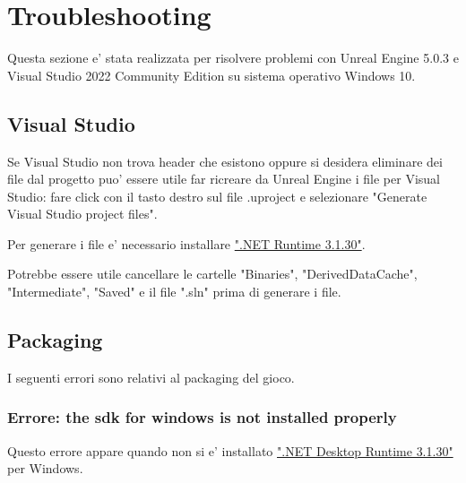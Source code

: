 \chapter{Troubleshooting}

    \begin{notebox}
        Questa sezione e' stata realizzata per risolvere problemi con Unreal Engine 5.0.3 e Visual Studio 2022 Community Edition su sistema operativo Windows 10.
    \end{notebox}


    \section{Visual Studio}

        \begin{nohyphens}
            Se Visual Studio non trova header che esistono oppure si desidera eliminare dei file dal progetto puo' essere utile far ricreare da Unreal Engine i file per Visual Studio: fare click con il tasto destro sul file .uproject e selezionare "Generate Visual Studio project files".
        \end{nohyphens}

        \begin{warningbox}
            Per generare i file e' necessario installare \href{https://dotnet.microsoft.com/en-us/download/dotnet/3.1}{".NET Runtime 3.1.30"}.
        \end{warningbox}

        \begin{suggestionbox}
            Potrebbe essere utile cancellare le cartelle "Binaries", "DerivedDataCache", "Intermediate", "Saved" e il file ".sln" prima di generare i file.
        \end{suggestionbox}


    \section{Packaging}
        I seguenti errori sono relativi al packaging del gioco.

        \subsection{Errore: the sdk for windows is not installed properly}
            Questo errore appare quando non si e' installato \href{https://dotnet.microsoft.com/en-us/download/dotnet/3.1}{".NET Desktop Runtime 3.1.30"} per Windows.



